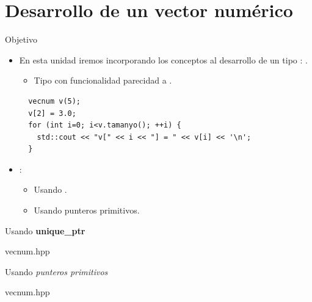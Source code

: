 \section{Desarrollo de un vector numérico}

\begin{frame}[t,fragile]{Objetivo}
\begin{itemize}
\item En esta unidad iremos incorporando los conceptos al desarrollo de un tipo 
      : .
  \begin{itemize}
    \item Tipo con funcionalidad parecidad a .
  \end{itemize}
\begin{lstlisting}
  vecnum v(5);
  v[2] = 3.0;
  for (int i=0; i<v.tamanyo(); ++i) {
    std::cout << "v[" << i << "] = " << v[i] << '\n';
  }
\end{lstlisting}

  \item {}:
  \begin{itemize}
    \item Usando .
    \item Usando punteros primitivos.
  \end{itemize}

\end{itemize}
\end{frame}

\begin{frame}[t]{Usando \textbf{unique\_ptr}}
\begin{block}{vecnum.hpp}

\end{block}
\end{frame}

\begin{frame}[t]{Usando \emph{punteros primitivos}}
\begin{block}{vecnum.hpp}

\end{block}
\end{frame}



